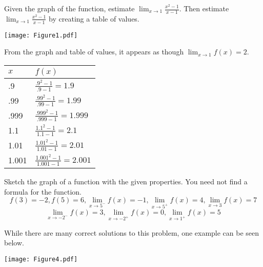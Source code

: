 \documentclass[handout,nooutcomes]{ximera}
\begin{document}
\begin{problem}
Given the graph of the function, estimate $\lim_{x \to 1} \frac{x^2 - 1}{x - 1} $.  Then estimate $\lim_{x \to 1} \frac{x^2 - 1}{x - 1} $ by creating a table of values.
	
	\begin{image}
	\texttt{[image: Figure1.pdf]}
	\end{image}
	
	\begin{freeResponse}
	From the graph and table of values, it appears as though $\lim_{x \to 1} f(x) = 2$.
	
	\begin{tabular}{|l|l|}
	\hline
	\hspace{2mm} $x$ & \hspace{4mm} $f(x)$  \\
	\hline
	.9 & $ \frac{{{.9}^{2}}-1}{.9-1}=1.9  $  \\
	\hline
	.99 & $ \frac{{{.99}^{2}}-1}{.99-1}=1.99 $  \\
	\hline
	.999 & $ \frac{{{.999}^{2}}-1}{.999-1}=1.999 $  \\
	\hline
	1.1 & $ \frac{{{1.1}^{2}}-1}{1.1-1}=2.1 $  \\
	\hline
	1.01 & $ \frac{{{1.01}^{2}}-1}{1.01-1}=2.01 $  \\
	\hline
	1.001 & $ \frac{{{1.001}^{2}}-1}{1.001-1}=2.001 $  \\
	\hline
	\end{tabular}
	
	\end{freeResponse}
	
\end{problem}
			
			
			

\begin{problem}
Sketch the graph of a function with the given properties.  You need not find a formula for the function.
	$$ f(3) = -2 , f(5) = 6 , \lim_{x \to 5^-} f(x) = -1 ,   \lim_{x \to 5^+} f(x) = 4 ,  \lim_{x \to 3} f(x) = 7 $$
	$$  \lim_{x \to -2^-} f(x) = 3 ,  \lim_{x \to -2^+} f(x) = 0 ,  \lim_{x \to 1^+} f(x) = 5  $$
	\begin{freeResponse}
	While there are many correct solutions to this problem, one example can be seen below.
	
		\begin{image}
		\texttt{[image: Figure4.pdf]}
		\end{image}
	\end{freeResponse}
\end{problem}
	
\end{document}
